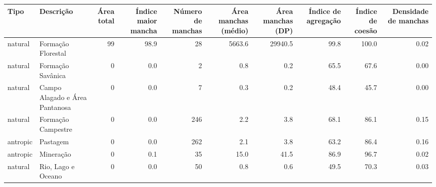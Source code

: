\documentclass[border=1mm, preview]{standalone}
\begin{document}
\begin{table}
\centering
\begin{tabular}{l|l|r|r|r|r|r|r|r|r}
\hline
Tipo & Descrição & Área total & Índice maior mancha & Número de manchas & Área manchas (médio) & Área manchas (DP) & Índice de agregação & Índice de coesão & Densidade de manchas\\
\hline
natural & Formação Florestal & 99 & 98.9 & 28 & 5663.6 & 29940.5 & 99.8 & 100.0 & 0.02\\
\hline
natural & Formação Savânica & 0 & 0.0 & 2 & 0.8 & 0.2 & 65.5 & 67.6 & 0.00\\
\hline
natural & Campo Alagado e Área Pantanosa & 0 & 0.0 & 7 & 0.3 & 0.2 & 48.4 & 45.7 & 0.00\\
\hline
natural & Formação Campestre & 0 & 0.0 & 246 & 2.2 & 3.8 & 68.1 & 86.1 & 0.15\\
\hline
antropic & Pastagem & 0 & 0.0 & 262 & 2.1 & 3.8 & 63.2 & 86.4 & 0.16\\
\hline
antropic & Mineração & 0 & 0.1 & 35 & 15.0 & 41.5 & 86.9 & 96.7 & 0.02\\
\hline
natural & Rio, Lago e Oceano & 0 & 0.0 & 50 & 0.8 & 0.6 & 49.5 & 70.3 & 0.03\\
\hline
\end{tabular}
\end{table}
\end{document}
